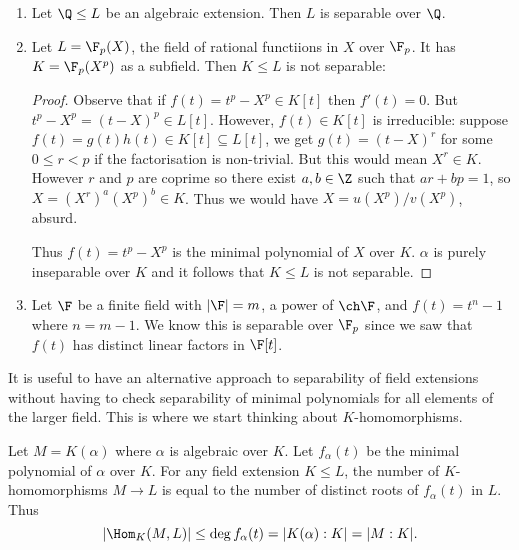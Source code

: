 \documentclass[a4paper]{article}
\begin{document}
\begin{eg}\leavevmode
  \begin{enumerate}
  \item Let \(\Q \leq L\) be an algebraic extension. Then \(L\) is separable over \(\Q\).
  \item Let \(L = \F_p(X)\), the field of rational functiions in \(X\) over \(\F_p\). It has \(K = \F_p(X^p)\) as a subfield. Then \(K \leq L\) is not separable:
    \begin{proof}
      Observe that if \(f(t) = t^p - X^p \in K[t]\) then \(f'(t) = 0\). But \(t^p - X^p = (t - X)^p \in L[t]\). However, \(f(t) \in K[t]\) is irreducible: suppose \(f(t) = g(t)h(t) \in K[t] \subseteq L[t]\), we get \(g(t) = (t - X)^r\) for some \(0 \leq r < p\) if the factorisation is non-trivial. But this would mean \(X^r \in K\). However \(r\) and \(p\) are coprime so there exist \(a, b \in \Z\) such that \(ar + bp = 1\), so \(X = (X^r)^a (X^p)^b \in K\). Thus we would have \(X = u(X^p)/v(X^p)\), absurd.

      Thus \(f(t) = t^p - X^p\) is the minimal polynomial of \(X\) over \(K\). \(\alpha\) is purely inseparable over \(K\) and it follows that \(K \leq L\) is not separable.
    \end{proof}
  \item Let \(\F\) be a finite field with \(|\F| = m\), a power of \(\ch \F\), and \(f(t) = t^n - 1\) where \(n = m - 1\). We know this is separable over \(\F_p\) since we saw that \(f(t)\) has distinct linear factors in \(\F[t]\).
  \end{enumerate}
\end{eg}

\begin{remark}
  It is useful to have an alternative approach to separability of field extensions without having to check separability of minimal polynomials for all elements of the larger field. This is where we start thinking about \(K\)-homomorphisms.
\end{remark}

\begin{lemma}
  Let \(M = K(\alpha)\) where \(\alpha\) is algebraic over \(K\). Let \(f_\alpha(t)\) be the minimal polynomial of \(\alpha\) over \(K\). For any field extension \(K \leq L\), the number of \(K\)-homomorphisms \(M \to L\) is equal to the number of distinct roots of \(f_\alpha(t)\) in \(L\). Thus
  \[
    |\Hom_K(M, L)| \leq \deg f_\alpha(t) = |K(\alpha):K| = |M:K|.
  \]
\end{lemma}
\end{document}
